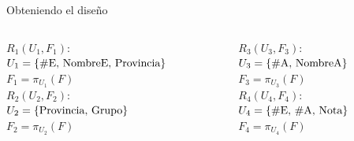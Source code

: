 \begin{frame}{Obteniendo el dise\~no}
\centering
\begin{columns}[T]
    \begin{column}{0.48\linewidth}
        $R_1(U_1,F_1)$:\\
        \indent $U_1 = \{\textnormal{\#E, NombreE, Provincia}\}$\\
        \indent $F_1 = \pi_{U_1}(F)$\\[2mm]
        $R_2(U_2,F_2)$:\\
        \indent $U_2 = \{\textnormal{Provincia, Grupo}\}$\\
        \indent $F_2 = \pi_{U_2}(F)$
    \end{column}


    \begin{column}{0.48\linewidth}
        $R_3(U_3,F_3)$:\\
        \indent $U_3 = \{\textnormal{\#A, NombreA}\}$\\
        \indent $F_3 = \pi_{U_3}(F)$\\[2mm]
        $R_4(U_4,F_4)$:\\
        \indent $U_4 = \{\textnormal{\#E, \#A, Nota}\}$\\
        \indent $F_4 = \pi_{U_4}(F)$
    \end{column}
    
\end{columns}



\end{frame}

